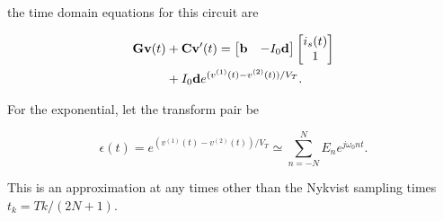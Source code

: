 \documentclass[12pt,journal,compsoc]{../ieeepaper/IEEEtran}
\begin{document}
the time domain equations for this circuit are

\begin{equation}\label{eqn:ece1254projectReport:1320}
\begin{aligned}
\BG \Bv(t)
&+ \BC \Bv'(t)
=
\begin{bmatrix}
\Bb & -I_0 \Bd
\end{bmatrix}
\begin{bmatrix}
i_s(t) \\
1
\end{bmatrix} \\
&+
I_0 \Bd
e^{ (v^{(1)}(t) - v^{(2)}(t))/V_T}.
\end{aligned}
\end{equation}

For the exponential, let the transform pair be

\begin{equation}\label{eqn:ece1254projectReport:1300}
\epsilon(t) = 
e^{ (v^{(1)}(t) - v^{(2)}(t))/V_T}
\simeq
\sum_{n=-N}^N E_n e^{ j \omega_0 n t }.
\end{equation}

This is an approximation at any times other than the Nykvist sampling times \( t_k = T k/(2 N + 1) \).
\end{document}
